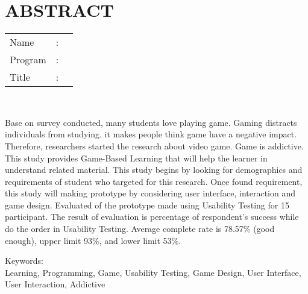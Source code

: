 %
%
%

	\chapter*{ABSTRACT}

\vspace*{0.2cm}

\noindent \begin{tabular}{l l p{11.0cm}}
	Name&: & \penulis \\
	Program&: & \programEng \\
	Title&: & \judulInggris \\
\end{tabular} \\ 

\vspace*{0.5cm}

\noindent 
Base on survey conducted, many students love playing game. Gaming distracts individuals from studying. it makes people think game have a negative impact. Therefore, researchers started the research about video game. Game is addictive. This study provides Game-Based Learning that will help the learner in understand related material. This study begins by looking for demographics and requirements of student who targeted for this research. Once found requirement, this study will making prototype by considering user interface, interaction and game design. Evaluated of the prototype made using Usability Testing for 15 participant. The result of evaluation is percentage of respondent's success while do the order in Usability Testing. Average complete rate is 78.57\% (good enough), upper limit 93\%, and lower limit 53\%.

\vspace*{0.2cm}

\noindent Keywords: \\ 
\noindent Learning, Programming, Game, Usability Testing, Game Design, User Interface, User Interaction, Addictive\\

\newpage